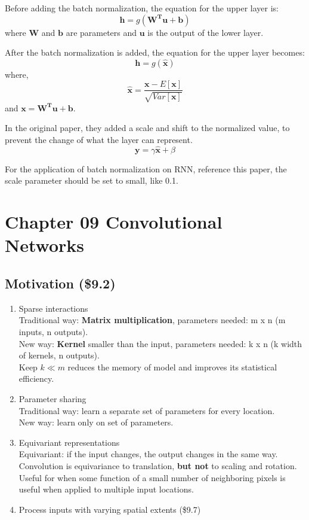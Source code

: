 \documentclass[12pt]{article}
\numberwithin{equation}{section}
\begin{document}
	Before adding the batch normalization, the equation for the upper layer is:
	\begin{equation}
		\bm{h}=g(\bm{W^Tu+b})
	\end{equation}
	where $\bm{W}$ and $\bm{b}$ are parameters and $\bm{u}$ is the output of the lower layer.\par
	After the batch normalization is added, the equation for the upper layer becomes:
	\begin{equation}
		\bm{h}=g(\bm{\bm{\hat{x}}})
	\end{equation}
	where, 
	\begin{equation}
		\bm{\hat{x}}=\frac{\bm{x}-E[\bm{x}]}{\sqrt{Var[\bm{x}]}}
	\end{equation}
	and $\bm{x}=\bm{W^Tu+b}$. \par
	In the original paper\citep{ioffe2015batch}, they added a scale and shift to the normalized value, to prevent the change of what the layer can represent. 
	\begin{equation}
		\bm{y}=\gamma \bm{\hat{x}}+\beta
	\end{equation} \par
	For the application of batch normalization on RNN, reference this paper\citep{cooijmans2016recurrent}, the scale parameter should be set to small, like 0.1. \par
\section{Chapter 09 Convolutional Networks}
\subsection{Motivation (\$9.2)}
\begin{enumerate}
	\item Sparse interactions \\
	Traditional way: \textbf{Matrix multiplication}, parameters needed: m x n (m inputs, n outputs). \\
	New way: \textbf{Kernel} smaller than the input, parameters needed: k x n (k width of kernels, n outputs).  \\
	Keep $k \ll m$ reduces the memory of model and improves its statistical efficiency. 
	\item Parameter sharing \\
	Traditional way: learn a separate set of parameters for every location. \\
	New way: learn only on set of parameters. 
	\item Equivariant representations \\
	Equivariant: if the input changes, the output changes in the same way. \\
	Convolution is equivariance to translation, \textbf{but not} to scaling and rotation. \\
	Useful for when some function of a small number of neighboring pixels is useful when applied to multiple input locations.
	\item Process inputs with varying spatial extents (\$9.7) 
\end{enumerate}
\end{document}
